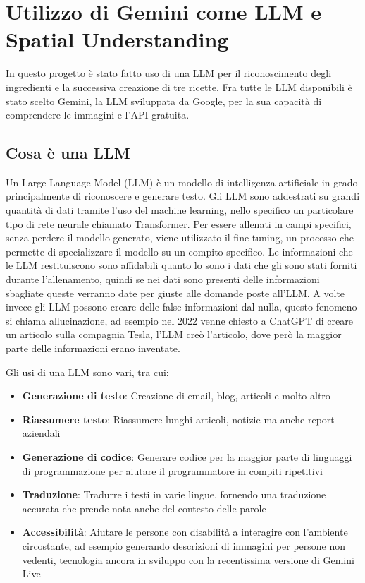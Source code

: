 \chapter{Utilizzo di Gemini come LLM e Spatial Understanding}
\pagestyle{plain}
In questo progetto è stato fatto uso di una LLM per il riconoscimento degli ingredienti e la successiva creazione di tre ricette. Fra tutte le LLM disponibili è stato scelto Gemini, la LLM sviluppata da Google, per la sua capacità di comprendere le immagini e l'API gratuita.

\section{Cosa è una LLM}
Un Large Language Model (LLM) è un modello di intelligenza artificiale in grado principalmente di riconoscere e generare testo. Gli LLM sono addestrati su grandi quantità di dati tramite l'uso del machine learning, nello specifico un particolare tipo di rete neurale chiamato Transformer. Per essere allenati in campi specifici, senza perdere il modello generato, viene utilizzato il fine-tuning, un processo che permette di specializzare il modello su un compito specifico.
Le informazioni che le LLM restituiscono sono affidabili quanto lo sono i dati che gli sono stati forniti durante l'allenamento, quindi se nei dati sono presenti delle informazioni sbagliate queste verranno date per giuste alle domande poste all'LLM. A volte invece gli LLM possono creare delle false informazioni dal nulla, questo fenomeno si chiama allucinazione, ad esempio nel 2022 venne chiesto a ChatGPT di creare un articolo sulla compagnia Tesla, l'LLM creò l'articolo, dove però la maggior parte delle informazioni erano inventate.\cite{LLMCloudflare}

Gli usi di una LLM sono vari, tra cui:
\begin{itemize}
    \item \textbf{Generazione di testo}: Creazione di email, blog, articoli e molto altro
    \item \textbf{Riassumere testo}: Riassumere lunghi articoli, notizie ma anche report aziendali
    \item \textbf{Generazione di codice}: Generare codice per la maggior parte di linguaggi di programmazione per aiutare il programmatore in compiti ripetitivi 
    \item \textbf{Traduzione}: Tradurre i testi in varie lingue, fornendo una traduzione accurata che prende nota anche del contesto delle parole
    \item \textbf{Accessibilità}: Aiutare le persone con disabilità a interagire con l'ambiente circostante, ad esempio generando descrizioni di immagini per persone non vedenti, tecnologia ancora in sviluppo con la recentissima versione di Gemini Live
\end{itemize}
\cite{LLMIBM} \cite{GeminiLiveBlog} \cite{GeminiLiveYoutube}

